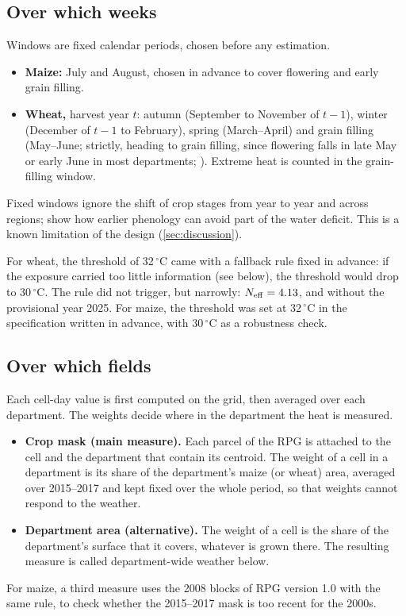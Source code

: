 \subsection{Over which weeks}

Windows are fixed calendar periods, chosen before any estimation.
\begin{itemize}
  \item \textbf{Maize:} July and August, chosen in advance to cover flowering and early grain filling.
  \item \textbf{Wheat,} harvest year $t$: autumn (September to November of $t-1$), winter (December of $t-1$ to February), spring (March--April) and grain filling (May--June; strictly, heading to grain filling, since flowering falls in late May or early June in most departments; \cite{noiajunior2025}). Extreme heat is counted in the grain-filling window.
\end{itemize}
Fixed windows ignore the shift of crop stages from year to year and across regions; \textcite{leroux2024} show how earlier phenology can avoid part of the water deficit. This is a known limitation of the design (\cref{sec:discussion}).

For wheat, the threshold of 32\,$^{\circ}$C came with a fallback rule fixed in advance: if the exposure carried too little information (see below), the threshold would drop to 30\,$^{\circ}$C. The rule did not trigger, but narrowly: $N_{\mathrm{eff}} = 4.13$, and \NeffWheatNoTwentyFive{} without the provisional year 2025. For maize, the threshold was set at 32\,$^{\circ}$C in the specification written in advance, with 30\,$^{\circ}$C as a robustness check.

\subsection{Over which fields}

Each cell-day value is first computed on the grid, then averaged over each department. The weights decide where in the department the heat is measured.
\begin{itemize}
  \item \textbf{Crop mask (main measure).} Each parcel of the RPG is attached to the cell and the department that contain its centroid. The weight of a cell in a department is its share of the department's maize (or wheat) area, averaged over 2015--2017 and kept fixed over the whole period, so that weights cannot respond to the weather.
  \item \textbf{Department area (alternative).} The weight of a cell is the share of the department's surface that it covers, whatever is grown there. The resulting measure is called department-wide weather below.
\end{itemize}
For maize, a third measure uses the 2008 blocks of RPG version 1.0 with the same rule, to check whether the 2015--2017 mask is too recent for the 2000s.

